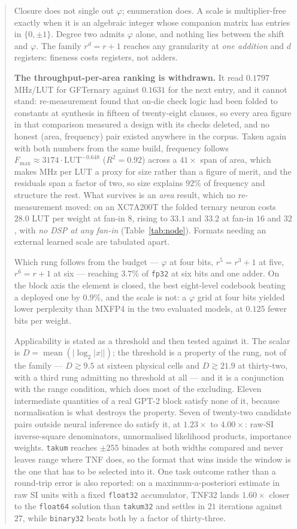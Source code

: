 \documentclass[11pt]{article}
\theoremstyle{definition}
\begin{document}
\begin{abstract}
Closure does not single out $\varphi$; enumeration does. A scale is
multiplier-free exactly when it is an algebraic integer whose companion matrix
has entries in $\{0,\pm1\}$. Degree two admits $\varphi$ alone, and nothing lies
between the shift and $\varphi$. The family $r^d=r+1$ reaches any granularity at
\emph{one addition} and $d$ registers: fineness costs registers, not adders.

\textbf{The throughput-per-area ranking is withdrawn.} It read
$0.1797$\,MHz/LUT for GFTernary against $0.1631$ for the next entry, and it
cannot stand: re-measurement found that on-die check logic had been folded to
constants at synthesis in fifteen of twenty-eight clauses, so every area figure
in that comparison measured a design with its checks deleted, and no honest
(area, frequency) pair existed anywhere in the corpus. Taken again with both
numbers from the same build, frequency follows
$F_{\max}\approx 3174\cdot\mathrm{LUT}^{-0.648}$ ($R^2=0.92$) across a
$41\times$ span of area, which makes MHz per LUT a proxy for size rather than a
figure of merit, and the residuals span a factor of two, so size explains $92\%$
of frequency and structure the rest. What survives is an \emph{area} result,
which no re-measurement moved: on an XC7A200T the folded ternary neuron costs
$28.0$ LUT per weight at fan-in $8$, rising to $33.1$ and $33.2$ at fan-in $16$
and $32$, with \emph{no DSP at any fan-in} (Table~\ref{tab:node}). Formats
needing an external learned scale are tabulated apart.

Which rung follows from the budget --- $\varphi$ at four bits, $r^5{=}r^3{+}1$ at
five, $r^6{=}r{+}1$ at six --- reaching $3.7\%$ of \texttt{fp32} at six bits and
one adder. On the block axis the element is closed, the best eight-level
codebook beating a deployed one by $0.9\%$, and the scale is not: a $\varphi$
grid at four bits yielded lower perplexity than MXFP4 in the two evaluated models,
at $0.125$ fewer bits per weight.

Applicability is stated as a threshold and then tested against it. The scalar is
$D=\operatorname{mean}(\lvert\log_2|x|\rvert)$; the threshold is a property of the
rung, not of the family --- $D \gtrsim 9.5$ at sixteen physical cells and
$D \gtrsim 21.9$ at thirty-two, with a third rung admitting no threshold at all ---
and it is a conjunction with the range condition, which does most of the excluding.
Eleven intermediate quantities of a real GPT-2 block satisfy none of it, because
normalisation is what destroys the property. Seven of twenty-two candidate pairs
outside neural inference do satisfy it, at $1.23\times$ to $4.00\times$: raw-SI
inverse-square denominators, unnormalised likelihood products, importance weights.
\texttt{takum} reaches $\pm 255$ binades at both widths compared and never leaves
range where TNF does, so the format that wins inside the window is the one that has
to be selected into it. One task outcome rather than a round-trip error is also
reported: on a maximum-a-posteriori estimate in raw SI units with a fixed
\texttt{float32} accumulator, TNF32 lands $1.60\times$ closer to the
\texttt{float64} solution than \texttt{takum32} and settles in $21$ iterations
against $27$, while \texttt{binary32} beats both by a factor of thirty-three.


\end{abstract}
\end{document}
